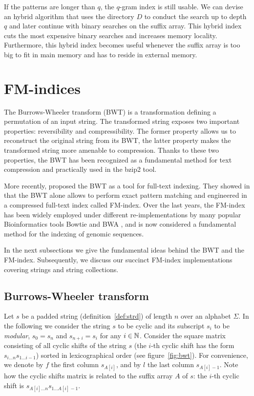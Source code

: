 If the patterns are longer than $q$, the $q$-gram index is still usable.
We can devise an hybrid algorithm that uses the directory $D$ to conduct the search up to depth $q$ and later continue with binary searches on the suffix array.
This hybrid index cuts the most expensive binary searches and increases memory locality.
Furthermore, this hybrid index becomes useful whenever the suffix array is too big to fit in main memory and has to reside in external memory.

\section{FM-indices}

The Burrows-Wheeler transform (BWT) \citep{Burrows1994} is a transformation defining a permutation of an input string.
The transformed string exposes two important properties: reversibility and compressibility.
The former property allows us to reconstruct the original string from its BWT, the latter property makes the transformed string more amenable to compression.
Thanks to these two properties, the BWT has been recognized as a fundamental method for text compression and practically used in the bzip2 \citep{Seward1996} tool.

More recently, \citeauthor{Ferragina2000} proposed the BWT as a tool for full-text indexing.
They showed in \citep{Ferragina2000} that the BWT alone allows to perform exact pattern matching and engineered in \citep{Ferragina2001} a compressed full-text index called FM-index.
Over the last years, the FM-index has been widely employed under different re-implementations by many popular Bioinformatics tools \eg Bowtie \citep{Bowtie} and BWA \citep{BWA}, and is now considered a fundamental method for the indexing of genomic sequences.

In the next subsections we give the fundamental ideas behind the BWT and the FM-index.
Subsequently, we discuss our succinct FM-index implementations covering strings and string collections.

\subsection{Burrows-Wheeler transform}

Let $s$ be a padded string (definition~\ref{def:strd}) of length $n$ over an alphabet $\Sigma$.
In the following we consider the string $s$ to be cyclic and its subscript $s_i$ to be \emph{modular}, \eg $s_0 = s_{n}$ and $s_{n+i} = s_i$ for any $i \in \mathbb {N}$.
Consider the square matrix consisting of all cyclic shifts of the string $s$ (the $i$-th cyclic shift has the form $s_{i \dots n} s_{1 \dots i-1}$) sorted in lexicographical order (see figure~\ref{fig:bwt}).
For convenience, we denote by $f$ the first column $s_{A[i]}$, and by $l$ the last column $s_{A[i] - 1}$.
Note how the cyclic shifts matrix is related to the suffix array $A$ of $s$: the $i$-th cyclic shift is $s_{A[i] \dots n} s_{1 \dots A[i]-1}$.

